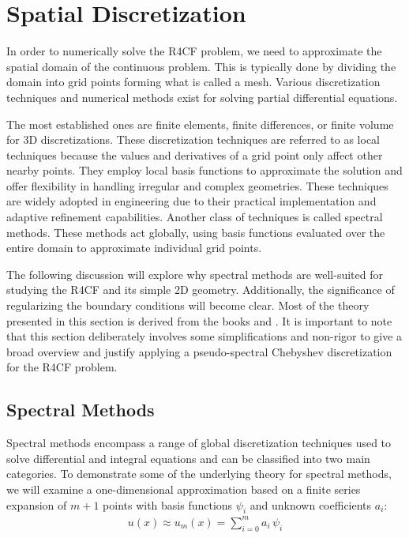 
\section{Spatial Discretization} \label{sec:spectral}

In order to numerically solve the R4CF problem, we need to approximate the
spatial domain of the continuous problem. This is typically done by dividing
the domain into grid points forming what is called a mesh. Various
discretization techniques and numerical methods exist for solving partial
differential equations.

The most established ones are finite elements, finite differences, or finite
volume for 3D discretizations. These discretization techniques are referred to
as local techniques because the values and derivatives of a grid point only
affect other nearby points. They employ local basis functions to approximate
the solution and offer flexibility in handling irregular and complex
geometries. These techniques are widely adopted in engineering due to their
practical implementation and adaptive refinement capabilities. Another class of
techniques is called spectral methods. These methods act globally, using basis
functions evaluated over the entire domain to approximate individual grid
points.

The following discussion will explore why spectral methods are well-suited for
studying the R4CF and its simple 2D geometry. Additionally, the significance of
regularizing the boundary conditions will become clear. Most of the theory
presented in this section is derived from the books \citet{boyd2001} and
\citet{canuto2006}. It is important to note that this section deliberately
involves some simplifications and non-rigor to give a broad overview and
justify applying a pseudo-spectral Chebyshev discretization for the R4CF
problem.

\subsection{Spectral Methods}

Spectral methods encompass a range of global discretization techniques used to
solve differential and integral equations and can be classified into two main
categories. To demonstrate some of the underlying theory for spectral methods,
we will examine a one-dimensional approximation based on a finite series
expansion of $m+1$ points with basis functions $\psi_i$ and unknown
coefficients $a_i$:
\begin{align}
u(x) \approx u_m(x) = \sum_{i=0}^{m} a_i \, \psi_i 
\label{eq:approx}
\end{align}

